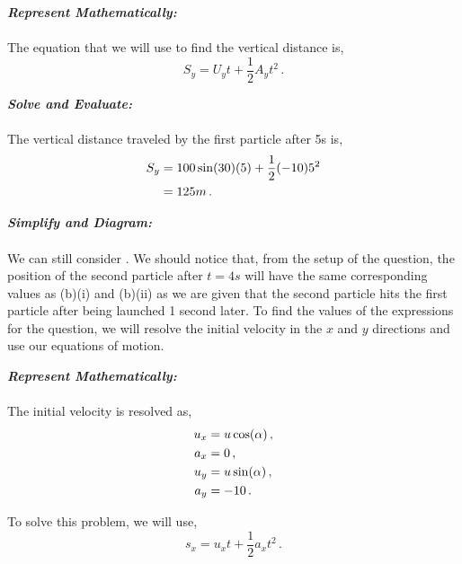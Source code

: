 \begin{subquestions}
\begin{subsubquestions}

\subsubquestion

\textbf{\textit{Represent Mathematically:}} \\ \\			
The equation that we will use to find the vertical distance is,
\begin{equation}
	S_y =U_yt + \frac{1}{2}A_yt^2 \,.	
\end{equation}




\textbf{\textit{Solve and Evaluate:}} \\ \\
The vertical distance traveled by the first particle after 5s is,
\begin{align}
	S_y & = 100\sin(30)(5) + \frac{1}{2}(-10)5^2 \nonumber \\
		& = 125m \,.
\end{align}


\subsubquestion

\textbf{\textit{Simplify and Diagram:}} \\ \\
We can still consider . We should notice that, from the setup of the question, the position of the second particle after $t=4s$ will have the same corresponding values as (b)(i) and (b)(ii) as we are given that the second particle hits the first particle after being launched 1 second later. To find the values of the expressions for the question, we will resolve the initial velocity in the $x$ and $y$ directions and use our equations of motion.




\textbf{\textit{Represent Mathematically:}} \\ \\
The initial velocity is resolved as,
\begin{align}
	u_x & = u\cos(\alpha) \,, \nonumber \\
	a_x & = 0 \,, \nonumber \\
	u_y & = u\sin(\alpha) \,, \nonumber \\
	a_y & = -10 \,.
\end{align}

To solve this problem, we will use,
\begin{equation}
	s_x = u_xt + \frac{1}{2}a_xt^2 \,.
\end{equation}





\end{subsubquestions}
\end{subquestions}

